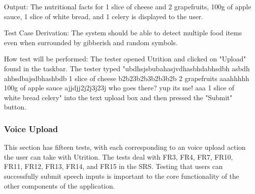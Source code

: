 \documentclass[12pt, titlepage]{article}
\begin{document}
\begin{enumerate}
	Output: The nutritional facts for 1 slice of cheese and 2 grapefruits, 100g of apple sauce, 1 slice of white bread, and 1 celery is displayed to the user.
	
	Test Case Derivation: The system should be able to detect multiple food items even when surrounded by gibberish and random symbols.
	
	How test will be performed: The tester opened Utrition and clicked on "Upload" found in the taskbar. The tester typed "ubdhsjsbubahasjvdhasbhdabhsdbh asbdh ahbsdbajsdbhashbdb 1 slice of cheese b2b23b2b3b2b3b2b 2 grapefruits aaahhhhh 100g of apple sauce ajjdjj2j2j3j23j who goes there? yup its me! aaa 1 slice of white bread celery" into the text upload box and then pressed the "Submit" button.

	\end{enumerate}

	\subsubsection{Voice Upload}
	This section has fifteen tests, with each corresponding to an voice upload action the user can take with Utrition. The tests deal with FR3, FR4, FR7, FR10, FR11, FR12, FR13, FR14, and FR15 in the SRS. 
	Testing that users can successfully submit speech inputs is 
	important to the core functionality of the other components of the 
	application.
	
\end{document}
